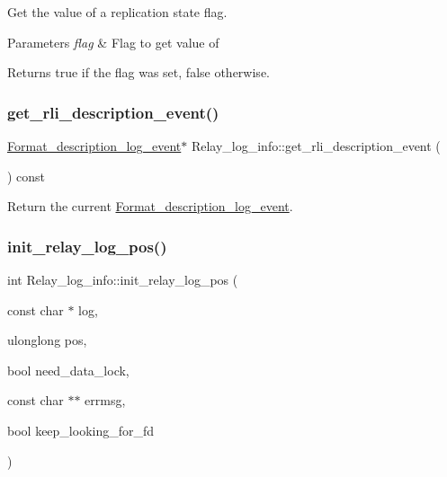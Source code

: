 Get the value of a replication state flag.


\begin{DoxyParams}{Parameters}
{\em flag} & Flag to get value of\\
\hline
\end{DoxyParams}
\begin{DoxyReturn}{Returns}
{\ttfamily true} if the flag was set, {\ttfamily false} otherwise. 
\end{DoxyReturn}
\mbox{\label{classRelay__log__info_a613b8ded75247b3715590acee3169ef0}} 
\subsubsection{\texorpdfstring{get\+\_\+rli\+\_\+description\+\_\+event()}{get\_rli\_description\_event()}}
{\footnotesize\ttfamily \mbox{\hyperlink{classFormat__description__log__event}{Format\+\_\+description\+\_\+log\+\_\+event}}$\ast$ Relay\+\_\+log\+\_\+info\+::get\+\_\+rli\+\_\+description\+\_\+event (\begin{DoxyParamCaption}{ }\end{DoxyParamCaption}) const\hspace{0.3cm}{\ttfamily [inline]}}

Return the current \mbox{\hyperlink{classFormat__description__log__event}{Format\+\_\+description\+\_\+log\+\_\+event}}. \mbox{\label{classRelay__log__info_aec9eae2f70577d73ee930cd8223f5233}} 
\subsubsection{\texorpdfstring{init\+\_\+relay\+\_\+log\+\_\+pos()}{init\_relay\_log\_pos()}}
{\footnotesize\ttfamily int Relay\+\_\+log\+\_\+info\+::init\+\_\+relay\+\_\+log\+\_\+pos (\begin{DoxyParamCaption}\item[{const char $\ast$}]{log,  }\item[{ulonglong}]{pos,  }\item[{bool}]{need\+\_\+data\+\_\+lock,  }\item[{const char $\ast$$\ast$}]{errmsg,  }\item[{bool}]{keep\+\_\+looking\+\_\+for\+\_\+fd }\end{DoxyParamCaption})}

